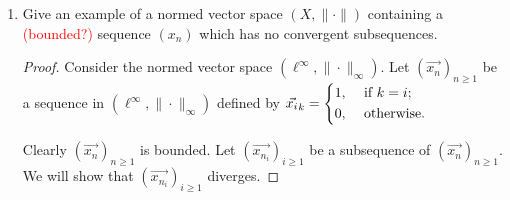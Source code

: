\documentclass{article}
\theoremstyle{plain} %
\numberwithin{thm}{section} %
\theoremstyle{definition}
\begin{document}
\begin{enumerate}[label=(\alph*)]
\begin{proof}
                Let \(\varepsilon > 0\). Since \((B_1, B_2, \dots, B_{k-1})\) and \((c_{n_{m_i}})_{i\geq1}\) converge,
                \[
                    \exists N_b , N_c > 0 \text{ such that } n_b > N_b \implies \| b_{n_b} - B \| _2 < \frac{\varepsilon}{2}\text{ and } n_c > N_c \implies | c_{n_c} - C | < \frac{\varepsilon}{2}
                \]
                Let \(N = \max \{N_b, N_c\}\). Let \(n \in \mathbb{N}\), \(n > N\). Then
                \[
                    \|a_n - (B_1, B_2, \dots, B_{k-1}, C) \| _2 = \sqrt{(a_1 - B_1)^2 + (a_2 - B_2)^2 + \dots + (a_{k-1} - B_{k-1})^2 + (a_k - C)^2} 
                \]
                Using an inequality that I don't know the name of, we have
                \[
                    \sqrt{(a_1 - B_1)^2 + (a_2 - B_2)^2 + \dots + (a_{k-1} - B_{k-1})^2 + (a_k - C)^2}
                \]
                \[
                    \leq \sqrt{(a_1 - B_1)^2 + (a_2 - B_2)^2 + \dots + (a_{k-1} - B_{k-1})^2} + \sqrt{(a_k - C)^2} = \| b_n - B \| _2 + | c_n - C | _2
                \]
                \[
                    < \frac{\varepsilon}{2} + \frac{\varepsilon}{2} = \varepsilon
                \]
                Thus \((a_{n_{m_i}})_{i\geq1}\) converges, which means that \((a_n)_{n\geq1}\) does indeed have a convergent subsequence. By the principle of induction, the Bolzano-Weierstrass Theorem holds in \((\mathbb{R}^d, \|\cdot\|_2)\) and we are done.
    
            \end{proof}
            \item Give an example of a normed vector space $(X,\|\cdot\|)$ containing a \textcolor{red}{(bounded?)} sequence $(x_n)$ which has no convergent subsequences.
            
            \begin{proof}
                Consider the normed vector space \((\ell^{\infty}, \| \cdot \| _\infty)\). Let \((\vec{x_n})_{n\geq1}\) be a sequence in \((\ell^{\infty}, \| \cdot \| _\infty)\) defined by \(\vec{x_i}_k = \begin{dcases}
                    1, &\text{ if } k=i ;\\
                    0, &\text{ otherwise} .
                \end{dcases}\)
    
                Clearly \((\vec{x_n})_{n\geq1}\) is bounded. Let \((\vec{x_{n_i}})_{i\geq1}\) be a subsequence of \((\vec{x_n})_{n\geq1}\). We will show that \((\vec{x_{n_i}})_{i\geq1}\) diverges.
    

\end{proof}
\end{enumerate}
\end{document}
